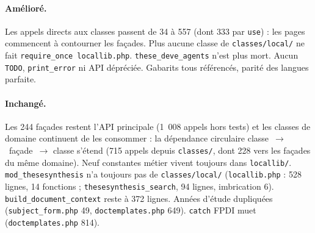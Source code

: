 \documentclass[11pt,a4paper]{article}
\newcommand{\fichier}[1]{\texttt{\small #1}}
\newcommand{\code}[1]{\texttt{#1}}
\begin{document}
\paragraph{Amélioré.}
Les appels directs aux classes passent de 34 à 557 (dont 333 par \code{use}) : les pages
commencent à contourner les façades. Plus aucune classe de \fichier{classes/local/} ne fait
\code{require\_once locallib.php}. \code{these\_deve\_agents} n'est plus mort. Aucun \code{TODO},
\code{print\_error} ni API dépréciée. Gabarits tous référencés, parité des langues parfaite.

\paragraph{Inchangé.}
Les 244 façades restent l'API principale (1~008 appels hors tests) et les classes de domaine
continuent de les consommer : la dépendance circulaire classe~$\rightarrow$~façade~$\rightarrow$
classe s'étend (715 appels depuis \fichier{classes/}, dont 228 vers les façades du même
domaine). Neuf constantes métier vivent toujours dans \fichier{locallib/}.
\code{mod\_thesesynthesis} n'a toujours pas de \fichier{classes/local/} (\fichier{locallib.php} :
528 lignes, 14 fonctions ; \code{thesesynthesis\_search}, 94 lignes, imbrication 6).
\code{build\_document\_context} reste à 372 lignes. Années d'étude dupliquées
(\fichier{subject\_form.php} 49, \fichier{doctemplates.php} 649). \code{catch} FPDI muet
(\fichier{doctemplates.php} 814).
\end{document}
